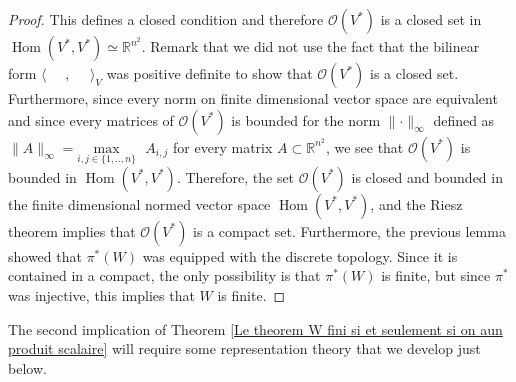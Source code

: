 \documentclass[envcountsame,envcountchap]{svmono}
\DeclareMathOperator{\Hom}{Hom}
\newcommand{\R}{\mathbb R}
\newcommand{\sub}{\subset}
\newcommand{\norm}[2]{\lVert #1 \lVert_{#2}}
\newcommand{\prods}[2]{\langle\qq #1\qq,\qq#2\qq\rangle}
\newcommand{\qq}{\text{ }}
\begin{document}
\begin{proof}
	 This defines a closed condition and therefore $\mathcal{O}(V^*)$ is a closed set in $\Hom(V^*,V^*)\simeq\R^{n^2}$. Remark that we did not use the fact that the bilinear form $\prods{}{}_V$ was positive definite to show that $\mathcal{O}(V^*)$ is a closed set. Furthermore, since every norm on finite dimensional vector space are equivalent and since every matrices of $\mathcal{O}(V^*)$ is bounded for the norm $\norm{\cdot}{\infty}$ defined as $\norm{A}{\infty}=\underset{i,j\in \{1,..,n\}}{\mbox{max}}\qq A_{i,j}$ for every matrix $A\sub \R^{n^2}$, we see that $\mathcal{O}(V^*)$ is bounded in $\Hom(V^*,V^*)$. Therefore, the set $\mathcal{O}(V^*)$ is closed and bounded in the finite dimensional normed vector space $\Hom(V^*,V^*)$, and the Riesz theorem implies that $\mathcal{O}(V^*)$ is a compact set. Furthermore, the previous lemma showed that $\pi^*(W)$ was equipped with the discrete topology. Since it is contained in a compact, the only possibility is that $\pi^*(W)$ is finite, but since $\pi^*$ was injective, this implies that $W$ is finite. 
\end{proof}
The second implication of Theorem \ref{Le theorem W fini si et seulement si on  aun produit scalaire} will require some representation theory that we develop just below. 
\end{document}
